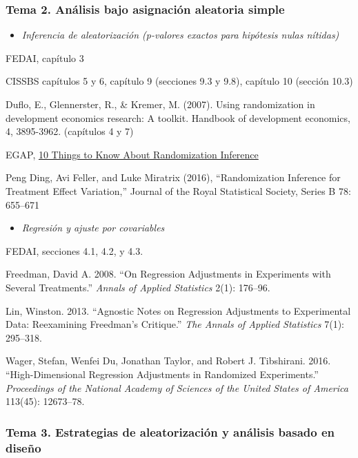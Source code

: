 \documentclass[
  12pt,
]{article}
\providecommand{\tightlist}{%
  \setlength{\itemsep}{0pt}\setlength{\parskip}{0pt}}
\begin{document}
\hypertarget{tema-2.-anuxe1lisis-bajo-asignaciuxf3n-aleatoria-simple}{%
\subsubsection{Tema 2. Análisis bajo asignación aleatoria
simple}\label{tema-2.-anuxe1lisis-bajo-asignaciuxf3n-aleatoria-simple}}

\begin{itemize}
\tightlist
\item
  \emph{Inferencia de aleatorización (p-valores exactos para hipótesis
  nulas nítidas)}
\end{itemize}

FEDAI, capítulo 3

CISSBS capítulos 5 y 6, capítulo 9 (secciones 9.3 y 9.8), capítulo 10
(sección 10.3)

Duflo, E., Glennerster, R., \& Kremer, M. (2007). Using randomization in
development economics research: A toolkit. Handbook of development
economics, 4, 3895-3962. (capítulos 4 y 7)

EGAP,
\href{https://egap.org/resource/10-things-to-know-about-hypothesis-testing/}{10
Things to Know About Randomization Inference}

Peng Ding, Avi Feller, and Luke Miratrix (2016), ``Randomization
Inference for Treatment Effect Variation,'' Journal of the Royal
Statistical Society, Series B 78: 655--671

\begin{itemize}
\tightlist
\item
  \emph{Regresión y ajuste por covariables}
\end{itemize}

FEDAI, secciones 4.1, 4.2, y 4.3.

Freedman, David A. 2008. ``On Regression Adjustments in Experiments with
Several Treatments.'' \emph{Annals of Applied Statistics} 2(1): 176--96.

Lin, Winston. 2013. ``Agnostic Notes on Regression Adjustments to
Experimental Data: Reexamining Freedman's Critique.'' \emph{The Annals
of Applied Statistics} 7(1): 295--318.

Wager, Stefan, Wenfei Du, Jonathan Taylor, and Robert J. Tibshirani.
2016. ``High-Dimensional Regression Adjustments in Randomized
Experiments.'' \emph{Proceedings of the National Academy of Sciences of
the United States of America} 113(45): 12673--78.

\hypertarget{tema-3.-estrategias-de-aleatorizaciuxf3n-y-anuxe1lisis-basado-en-diseuxf1o}{%
\subsubsection{Tema 3. Estrategias de aleatorización y análisis basado
en
diseño}\label{tema-3.-estrategias-de-aleatorizaciuxf3n-y-anuxe1lisis-basado-en-diseuxf1o}}
\end{document}
